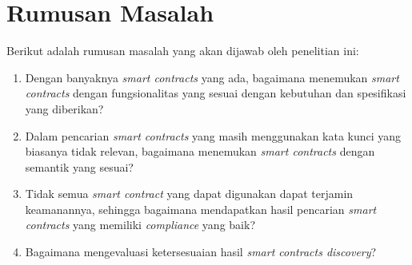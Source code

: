 






\section{Rumusan Masalah}
\label{sec:rumusan-masalah}

Berikut adalah rumusan masalah yang akan dijawab oleh penelitian ini:
\begin{enumerate}
  \item Dengan banyaknya \textit{smart contracts} yang ada, bagaimana menemukan \textit{smart contracts} dengan fungsionalitas yang sesuai dengan kebutuhan dan spesifikasi yang diberikan?
  \item Dalam pencarian \textit{smart contracts} yang masih menggunakan kata kunci yang biasanya tidak relevan, bagaimana menemukan \textit{smart contracts} dengan semantik yang sesuai?
  \item Tidak semua \textit{smart contract} yang dapat digunakan dapat terjamin keamanannya, sehingga bagaimana mendapatkan hasil pencarian \textit{smart contracts} yang memiliki \textit{compliance} yang baik?
  \item Bagaimana mengevaluasi ketersesuaian hasil \textit{smart contracts discovery}?
\end{enumerate}

